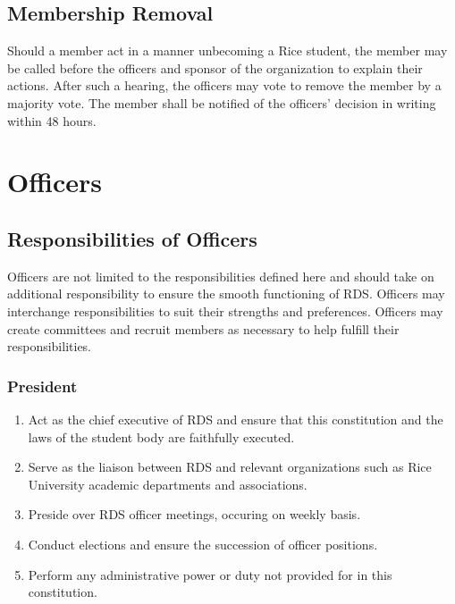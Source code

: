 \documentclass[12pt]{article}
\begin{document}
\subsection{Membership Removal}

Should a member act in a manner unbecoming a Rice student, the member may be
called before the officers and sponsor of the organization to explain their
actions. After such a hearing, the officers may vote to remove the member by a
majority vote. The member shall be notified of the officers' decision in
writing within 48 hours.

\section{Officers}

\subsection{Responsibilities of Officers}

Officers are not limited to the responsibilities defined here and should take
on additional responsibility to ensure the smooth functioning of RDS. Officers
may interchange responsibilities to suit their strengths and preferences.
Officers may create committees and recruit members as necessary to help fulfill
their responsibilities.


\subsubsection{President}

\begin{enumerate}

  \item Act as the chief executive of RDS and ensure that this constitution and
    the laws of the student body are faithfully executed.
     
  \item Serve as the liaison between RDS and relevant organizations such as Rice
    University academic departments and associations. 

  \item Preside over RDS officer meetings, occuring on weekly basis. 

  \item Conduct elections and ensure the succession of officer positions. 

  \item Perform any administrative power or duty not provided for in this
    constitution.

\end{enumerate}
\end{document}
